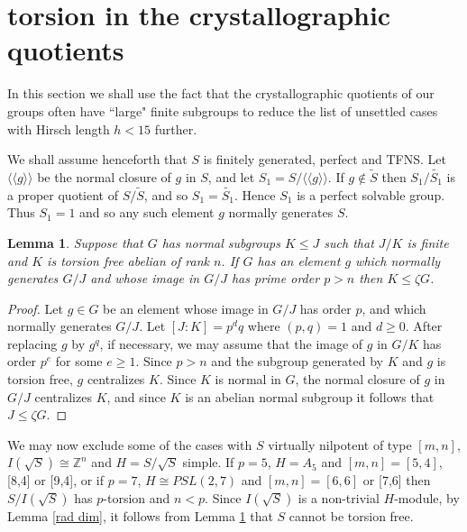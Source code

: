\documentclass[12pt]{amsart}
\renewcommand{\geq}{\geqslant}
\renewcommand{\leq}{\leqslant}
\newtheorem{lemma}[theorem]{Lemma}
\begin{document}


\section{torsion in the crystallographic quotients}

In this section we shall use the fact that the crystallographic quotients of our groups 
often have ``large" finite subgroups to reduce the list of unsettled cases 
with Hirsch length $h<15$ further.

We shall assume henceforth that $S$ is finitely generated,  perfect and TFNS.
Let $\langle\langle{g}\rangle\rangle$ be the normal closure of $g$ in $S$,
and let $S_1=S/\langle\langle{g}\rangle\rangle$.
If $g\notin\widetilde{S}$ then $S_1/\widetilde{S_1}$ is a proper quotient 
of $S/\widetilde{S}$, and so $S_1=\widetilde{S_1}$.
Hence $S_1$ is a perfect solvable group.
Thus $S_1=1$ and so any such element $g$ normally generates $S$.

\begin{lemma}
\label{I(N)<zeta}
Suppose that $G$ has normal subgroups $K\leq{J}$ such that $J/K$ is finite
and $K$ is torsion free abelian of rank $n$.
If $G$ has an element $g$ which normally generates $G/J$ and
whose image in $G/J$ has prime order $p>n$ then $K\leq\zeta{G}$.
\end{lemma}

\begin{proof}
Let $g\in{G}$ be an element whose image in $G/J$ has order $p$,
and which normally generates $G/J$.
Let $[J:K]=p^dq$ where $(p,q)=1$ and $d\geq0$.
After replacing $g$ by $g^q$, if necessary, 
we may assume that the image of $g$ in $G/K$ has order $p^e$ for some $e\geq1$.
Since $p>n$ and the subgroup generated by $K$ and $g$ is torsion free, 
$g$ centralizes $K$.
Since $K$ is normal in $G$,
the normal closure of $g$ in $G/J$ centralizes $K$, 
and since $K$ is an abelian normal subgroup it follows that $J\leq\zeta{G}$.
\end{proof}

We may now exclude some of the cases with $S$ virtually nilpotent of type $[m,n]$, 
$I(\sqrt{S})\cong\mathbb{Z}^n$ and $H=S/\sqrt{S}$ simple.
If $p=5$, $H=A_5$ and $[m,n]=[5,4]$, [8,4] or [9,4],
or if $p=7$, $H\cong{PSL(2,7)}$ and $[m,n]=[6,6]$ or [7,6]
then $S/I(\sqrt{S})$ has $p$-torsion \cite[Chapter 6]{HP} and $n<p$.
Since $I(\sqrt{S})$ is a non-trivial $H$-module,  by Lemma \ref{rad dim},
it follows from Lemma \ref{I(N)<zeta} that $S$ cannot be torsion free.
\end{document}
